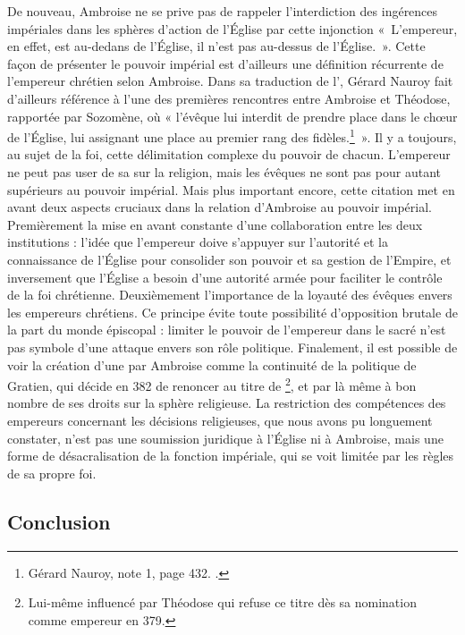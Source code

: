 De nouveau, Ambroise ne se prive pas de rappeler l'interdiction des ingérences impériales dans les sphères d'action de l'Église par cette injonction «~L'empereur, en effet, est au-dedans de l'Église, il n'est pas au-dessus de l'Église.~». Cette façon de présenter le pouvoir impérial est d'ailleurs une définition récurrente de l'empereur chrétien selon Ambroise. Dans sa traduction de l', Gérard Nauroy fait d'ailleurs référence à l'une des premières rencontres entre Ambroise et Théodose, rapportée par Sozomène, où « l'évêque lui interdit de prendre place dans le chœur de l'Église, lui assignant une place au premier rang des fidèles.\footnote{Gérard Nauroy, note 1, page 432. \cite[\nopp 75A, 36]{ambroise_lettres}.}~». Il y a toujours, au sujet de la foi, cette délimitation complexe du pouvoir de chacun. L'empereur ne peut pas user de sa  sur la religion, mais les évêques ne sont pas pour autant supérieurs au pouvoir impérial. Mais plus important encore, cette citation met en avant deux aspects cruciaux dans la relation d'Ambroise au pouvoir impérial. Premièrement la mise en avant constante d'une collaboration entre les deux institutions : l'idée que l'empereur doive s'appuyer sur l'autorité et la connaissance de l'Église pour consolider son pouvoir et sa gestion de l'Empire, et inversement que l'Église a besoin d'une autorité armée pour faciliter le contrôle de la foi chrétienne. Deuxièmement l'importance de la loyauté des évêques envers les empereurs chrétiens. Ce principe évite toute possibilité d'opposition brutale de la part du monde épiscopal : limiter le pouvoir de l'empereur dans le sacré n'est pas symbole d'une attaque envers son rôle politique. Finalement, il est possible de voir la création d'une  par Ambroise comme la continuité de la politique de Gratien, qui décide en 382 de renoncer au titre de \footnote{Lui-même influencé par Théodose qui refuse ce titre dès sa nomination comme empereur en 379.}, et par là même à bon nombre de ses droits sur la sphère religieuse. La restriction des compétences des empereurs concernant les décisions religieuses, que nous avons pu longuement constater, n'est pas une soumission juridique à l'Église ni à Ambroise, mais une forme de désacralisation de la fonction impériale, qui se voit limitée par les règles de sa propre foi.

\bigskip

\subsection*{Conclusion}

